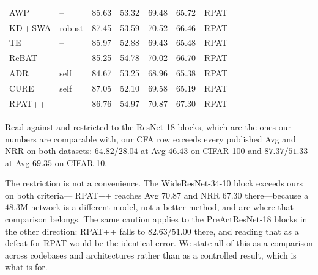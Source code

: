 \begin{table}[!htbp]
\begin{tabular}{llrrrrl}
    AWP \citep{2020_awp}      & --      & 85.63 & 53.32 & 69.48 & 65.72 & RPAT \\
    KD\,+\,SWA \citep{kdswa}   & robust  & 87.45 & 53.59 & 70.52 & 66.46 & RPAT \\
    TE \citep{te}             & --      & 85.97 & 52.88 & 69.43 & 65.48 & RPAT \\
    ReBAT \citep{rebat}       & --      & 85.25 & 54.78 & 70.02 & 66.70 & RPAT \\
    ADR \citep{adr}           & self    & 84.67 & 53.25 & 68.96 & 65.38 & RPAT \\
    CURE \citep{cure}         & self    & 87.05 & 52.10 & 69.58 & 65.19 & RPAT \\
    RPAT++ \citep{rpat}       & --      & 86.76 & 54.97 & 70.87 & 67.30 & RPAT \\
    \bottomrule
  \end{tabular}
\end{table}

Read against  and restricted to the ResNet-18 blocks, which are the ones our numbers
are comparable with, our CFA row exceeds every published Avg and NRR on both datasets: $64.82/28.04$
at Avg $46.43$ on CIFAR-100 and $87.37/51.33$ at Avg $69.35$ on CIFAR-10.

The restriction is not a convenience. The WideResNet-34-10 block exceeds ours on both criteria---
RPAT++ reaches Avg $70.87$ and NRR $67.30$ there---because a $48.3$M network is a different model, not
a better method, and  are where that comparison belongs. The same caution applies to the
PreActResNet-18 blocks in the other direction: RPAT++ falls to $82.63/51.00$ there, and reading that
as a defeat for RPAT would be the identical error. We state all of this as a comparison across
codebases and architectures rather than as a controlled result, which is what  is for.

